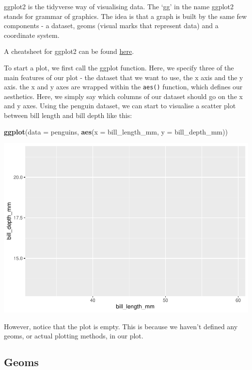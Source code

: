 \documentclass[
]{book}
\newenvironment{Shaded}{\begin{snugshade}}{\end{snugshade}}
\newcommand{\AttributeTok}[1]{\textcolor[rgb]{0.13,0.29,0.53}{#1}}
\newcommand{\FunctionTok}[1]{\textcolor[rgb]{0.13,0.29,0.53}{\textbf{#1}}}
\newcommand{\NormalTok}[1]{#1}
\begin{document}
ggplot2 is the tidyverse way of visualising data. The `gg' in the name ggplot2 stands for grammar of graphics. The idea is that a graph is built by the same few components - a dataset, geoms (visual marks that represent data) and a coordinate system.

A cheatsheet for ggplot2 can be found \href{https://rstudio.github.io/cheatsheets/html/data-visualization.html}{here}.

To start a plot, we first call the ggplot function. Here, we specify three of the main features of our plot - the dataset that we want to use, the x axis and the y axis. the x and y axes are wrapped within the \texttt{aes()} function, which defines our aesthetics. Here, we simply say which columns of our dataset should go on the x and y axes. Using the penguin dataset, we can start to visualise a scatter plot between bill length and bill depth like this:

\begin{Shaded}
\begin{Highlighting}[]
\FunctionTok{ggplot}\NormalTok{(}\AttributeTok{data =}\NormalTok{ penguins, }\FunctionTok{aes}\NormalTok{(}\AttributeTok{x =}\NormalTok{ bill\_length\_mm, }\AttributeTok{y =}\NormalTok{ bill\_depth\_mm))}
\end{Highlighting}
\end{Shaded}

\includegraphics{_main_files/figure-latex/unnamed-chunk-51-1.pdf}

However, notice that the plot is empty. This is because we haven't defined any geoms, or actual plotting methods, in our plot.

\hypertarget{geoms}{%
\subsection{Geoms}\label{geoms}}
\end{document}
